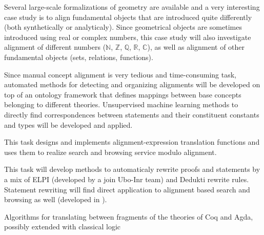 \begin{workpackage}
\begin{tasklist}
  \begin{task}[id=aligncasestudies,title=Case study: geometry,shorttitle=Cases,lead=Str,StrRM=18,BelRM=18,wphases=6-42!1]
    Several large-scale formalizations of geometry are available and a
    very interesting case study is to align fundamental objects that
    are introduced quite differently (both synthetically or
    analyticaly). Since geometrical objects are sometimes introduced
    using real or complex numbers, this case study will also
    investigate alignment of different numbers ($\mathbb{N}$,
    $\mathbb{Z}$, $\mathbb{Q}$, $\mathbb{R}$, $\mathbb{C}$), as well
    as alignment of other fundamental objects (sets, relations,
    functions).
  \end{task}

  \begin{task}[id=aligntheories,title=Automated proof engineering,shorttitle=Autom.,lead=Imt,ImtRM=6,InnRM=6,SacRM=6,wphases=6-24!1]
    Since manual concept alignment is very tedious and time-consuming
    task, automated methods for detecting and organizing alignments
    will be developed on top of an ontology framework that defines
    mappings between base concepts belonging to different
    theories. Unsupervised machine learning methods to directly find
    correspondences between statements and their constituent constants
    and types will be developed and applied.
  \end{task}

  \begin{task}[id=alignsearch,title=Alignment-Based Search,shorttitle=Search,lead=Fau,FauRM=11,wphases=5-48!.33]
    This task designs and implements alignment-expression translation
    functions and uses them to realize search and browsing service
    modulo alignment.
  \end{task}
  
  \begin{task}[id=alignproofs,title=Proof-Rewriting,shorttitle=Rewr.,lead=Bol,BolRM=13,InrRM=6,wphases=36-48!1.6]
    This task will develop methods to automaticaly rewrite proofs and
    statements by a mix of ELPI (developed by a join Ubo-Inr team) and
    Dedukti rewrite rules. Statement rewriting will find direct
    application to alignment based search and browsing as well
    (developed in ).
  \end{task}
\end{tasklist}

\begin{wpdelivs}
  \begin{wpdeliv}[due=24,id=prooftheoretical,dissem=PU,nature=DEM,lead=Lee,task=alignlogic]{Algorithms for translating between fragments of the theories of Coq and Agda, possibly extended with classical logic}\end{wpdeliv}


\end{wpdelivs}
\end{workpackage}
